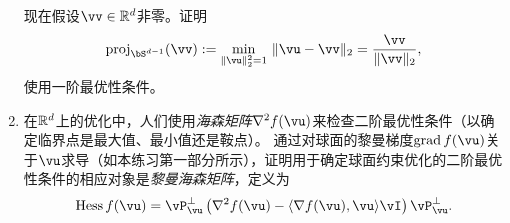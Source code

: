 \documentclass[../../book-main.tex]{subfiles}
\begin{document}
\begin{exercise}
\begin{enumerate}
        现在假设$\vv \in \R^d$非零。证明
        \begin{equation*}
            \mathrm{proj}_{\bS^{d-1}}(\vv) :=
            \min_{\norm{\vu}_2^2 = 1}\, \norm{\vu - \vv}_2 
            =
            \frac{\vv}{\norm{\vv}_2},
        \end{equation*}
        使用一阶最优性条件。
        \item 在$\mathbb{R}^d$上的优化中，人们使用\textit{海森矩阵}$\nabla^2 f(\vu)$来检查二阶最优性条件（以确定临界点是最大值、最小值还是鞍点）。
        通过对球面的黎曼梯度$\mathrm{grad}\, f(\vu)$关于$\vu$求导（如本练习第一部分所示），证明用于确定球面约束优化的二阶最优性条件的相应对象是\textit{黎曼海森矩阵}，定义为
        \begin{equation}\label{eq:exercise-riemann-hess-sphere}
            \mathrm{Hess}\, f(\vu) = \vP_{\vu}^\perp \left( 
            \nabla^2 f(\vu) - \ip{\nabla f(\vu)}{\vu} \vI
            \right) \vP_{\vu}^\perp.
        \end{equation}
    \end{enumerate}
\end{exercise}
\end{document}
